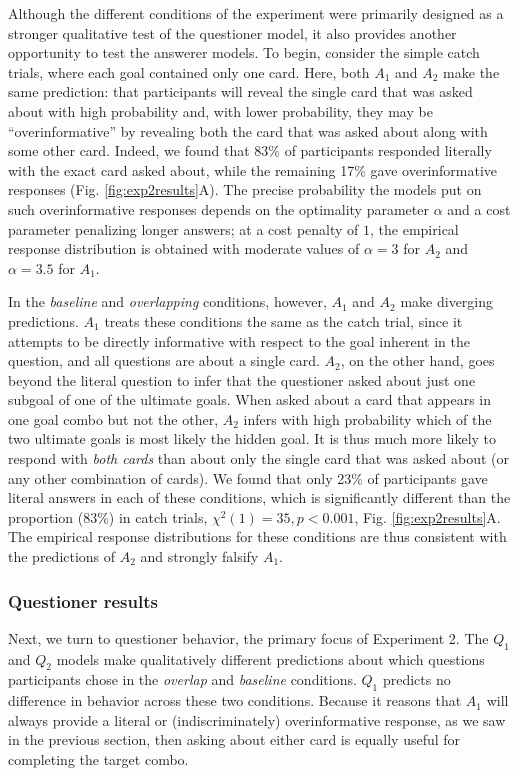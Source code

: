 \documentclass[12pt, floatsintext, jou]{apa6}
\begin{document}
Although the different conditions of the experiment were primarily designed as a stronger qualitative test of the questioner model, it also provides another opportunity to test the answerer models. 
To begin, consider the simple catch trials, where each goal contained only one card.
Here, both $A_1$ and $A_2$ make the same prediction: that participants will reveal the single card that was asked about with high probability and, with lower probability, they may be ``overinformative'' by revealing both the card that was asked about along with some other card.
Indeed, we found that 83\% of participants responded literally with the exact card asked about, while the remaining 17\% gave overinformative responses (Fig. \ref{fig:exp2results}A).
The precise probability the models put on such overinformative responses depends on the optimality parameter $\alpha$ and a cost parameter penalizing longer answers; at a cost penalty of $1$, the empirical response distribution is obtained with moderate values of $\alpha=3$ for $A_2$ and $\alpha = 3.5$ for $A_1$.

In the \emph{baseline} and \emph{overlapping} conditions, however, $A_1$ and $A_2$ make diverging predictions. 
$A_1$ treats these conditions the same as the catch trial, since it attempts to be directly informative with respect to the goal inherent in the question, and all questions are about a single card.
$A_2$, on the other hand, goes beyond the literal question to infer that the questioner asked about just one subgoal of one of the ultimate goals.
When asked about a card that appears in one goal combo but not the other, $A_2$ infers with high probability which of the two ultimate goals is most likely the hidden goal. 
It is thus much more likely to respond with \emph{both cards} than about only the single card that was asked about (or any other combination of cards). 
We found that only 23\% of participants gave literal answers in each of these conditions, which is significantly different than the proportion (83\%) in catch trials, $\chi^2(1) = 35, p < 0.001$, Fig. \ref{fig:exp2results}A.
The empirical response distributions for these conditions are thus consistent with the predictions of $A_2$ and strongly falsify $A_1$.

\subsubsection{Questioner results}

Next, we turn to questioner behavior, the primary focus of Experiment 2.
The $Q_1$ and $Q_2$ models make qualitatively different predictions about which questions participants chose in the \emph{overlap} and \emph{baseline} conditions.
$Q_1$ predicts no difference in behavior across these two conditions.
Because it reasons that $A_1$ will always provide a literal or (indiscriminately) overinformative response, as we saw in the previous section, then asking about either card is equally useful for completing the target combo.
\end{document}
